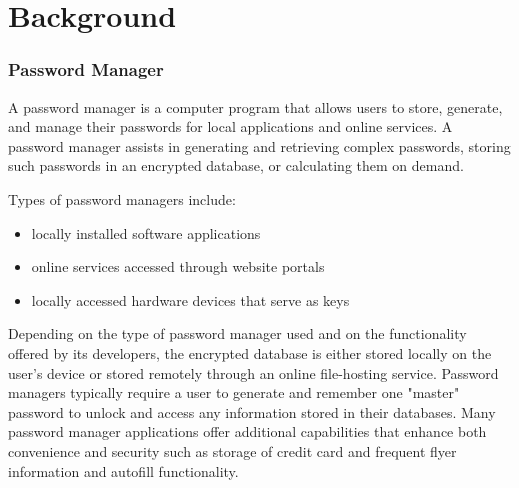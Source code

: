 \chapter{Background}
\label{sec:background}

\subsection*{Password Manager}

A password manager is a computer program that allows users to store, generate, and manage their passwords for local applications and online services.
A password manager assists in generating and retrieving complex passwords, storing such passwords in an encrypted database, or calculating them on demand.

Types of password managers include:

\begin{itemize}
    \item locally installed software applications
    \item online services accessed through website portals
    \item locally accessed hardware devices that serve as keys
\end{itemize}

Depending on the type of password manager used and on the functionality offered by its developers, the encrypted database is either stored locally on the user's device or stored remotely through an online file-hosting service. Password managers typically require a user to generate and remember one "master" password to unlock and access any information stored in their databases. Many password manager applications offer additional capabilities that enhance both convenience and security such as storage of credit card and frequent flyer information and autofill functionality.

